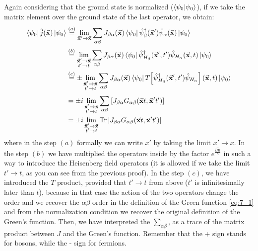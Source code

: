\documentclass[../main/main.tex]{subfiles}
\begin{document}
Again considering that the ground state is normalized (\( \braket{\psi _0}{\psi _0}  \)), if we take the matrix element over the ground state of the last operator, we obtain:
\begin{equation*}
\begin{split}
  \bra{\psi _0} \hat{j} (\va{x}) \ket{\psi _0}   & \overset{(a)}{=}
  \lim_{\va{x}' \rightarrow \va{x}} \sum_{\alpha \beta }^{} J_{\beta \alpha } (\va{x}) \bra{\psi _0} \hat{\psi }_ \beta ^\dag (\va{x}') \hat{\psi }_ \alpha  (\va{x}) \ket{\psi _0}         \\
  &\overset{(b)}{=}  \lim_{\substack{\va{x}' \rightarrow \va{x} \\ t' \rightarrow t } } \sum_{\alpha \beta }^{} J_{\beta \alpha } (\va{x}) \bra{\psi _0} \hat{\psi }_ {H_ \beta } ^\dag (\va{x}',t') \hat{\psi }_ {H_ \alpha }  (\va{x},t) \ket{\psi _0}   \\
  &\overset{(c)}{=}  \pm \lim_{\substack{\va{x}' \rightarrow \va{x} \\ t' \rightarrow t } } \sum_{\alpha \beta }^{} J_{\beta \alpha } (\va{x}) \bra{\psi _0} T \qty[  \hat{\psi }_ {H_ \beta } ^\dag (\va{x}',t') \hat{\psi }_ {H_ \alpha }]  (\va{x},t) \ket{\psi _0} \\
  & = \pm i
  \lim_{\substack{\va{x}' \rightarrow \va{x} \\ t' \rightarrow t } } \sum_{\alpha \beta }^{} \qty[ J_{\beta \alpha } G_{\alpha \beta }(\va{x}t,\va{x}'t')] \\
  &= \pm i
  \lim_{\substack{\va{x}' \rightarrow \va{x} \\ t' \rightarrow t } } \Tr \qty[ J_{\beta \alpha } G_{\alpha \beta }(\va{x}t,\va{x}'t')]
\end{split}
\end{equation*}
where in the step \( (a) \) formally we can write \( x' \) by taking the limit \( x' \rightarrow x \). In the step \( (b) \) we have multiplied the operators inside by the factor \( e^{\frac{i \hat{H} t}{\hbar }} \) in such a way to introduce the Heisenberg field operators (it is allowed if we take the limit \( t' \rightarrow t \), as you can see from the previous proof). In the step \( (c) \), we have introduced the \( T \) product, provided that  \( t' \rightarrow t \) from above (\( t' \) is infinitesimally later than \( t \)), because in that case the action of the two operators change the order and we recover the \( \alpha \beta  \) order in the definition of the Green function \eqref{eq:7_1} and from the normalization condition we recover the original definition of the Green's function.
Then, we have interpreted the \( \sum_{\alpha \beta }^{}   \), as a trace of the matrix product between \( J \) and the Green's function.
Remember that the + sign stands for bosons, while the - sign for fermions.
\end{document}
